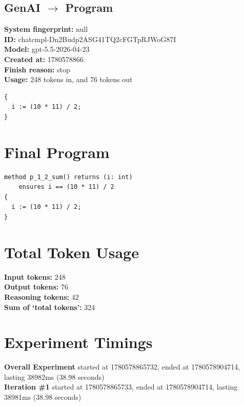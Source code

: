 \documentclass{article}
\begin{document}
\subsection*{GenAI $\rightarrow$ Program}
\textbf{System fingerprint: }null
\\\textbf{ID: }chatcmpl-Dn2Budp2ASG41TQ2cFGTpRJWoG87I
\\\textbf{Model: }gpt-5.5-2026-04-23
\\\textbf{Created at: }1780578866
\\\textbf{Finish reason: }stop
\\\textbf{Usage: }248 tokens in, and 76 tokens out
\begin{lstlisting}
{
  i := (10 * 11) / 2;
}
\end{lstlisting}
\section*{Final Program}
\begin{lstlisting}
method p_1_2_sum() returns (i: int)
	ensures i == (10 * 11) / 2
{
  i := (10 * 11) / 2;
}
\end{lstlisting}
\section*{Total Token Usage}
\textbf{Input tokens: }248
\\\textbf{Output tokens: }76
\\\textbf{Reasoning tokens: }42
\\\textbf{Sum of `total tokens': }324
\section*{Experiment Timings}
\textbf{Overall Experiment} started at 1780578865732, ended at 1780578904714, lasting 38982ms (38.98 seconds)
\\\textbf{Iteration \#1} started at 1780578865733, ended at 1780578904714, lasting 38981ms (38.98 seconds)
\end{document}
